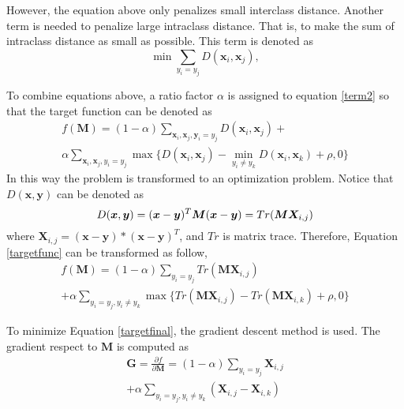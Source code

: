 \documentclass[conference,compsoc]{IEEEtran}
\begin{document}
 However, the equation above only penalizes small interclass distance. Another term is needed to penalize large intraclass distance. That is, to make the sum of intraclass distance as small as possible. This term is denoted as 
 \begin{equation}
 \min \sum_{y_i = y_j} D(\bm{x}_i,\bm{x}_j),
 \end{equation}
 
 To combine equations above, a ratio factor $\alpha$ is assigned to equation \ref{term2} so that the target function can be denoted as 
  \begin{equation}\label{targetfunc}
  \begin{aligned}
 f(\bm{M}) = (1-\alpha)\sum_{\bm{x}_i,\bm{x}_j,\bm{y}_i=y_j} D(\bm{x}_i,\bm{x}_j) + \\ 
 \alpha \sum_{\bm{x}_i,\bm{x}_j,y_i=y_j}\max\{{D(\bm{x}_i,\bm{x}_j)-\min_{y_i\ne y_k}{D(\bm{x}_i,\bm{x}_k)}+\rho,0}\}
 \end{aligned}
 \end{equation}
 In this way the problem is transformed to an optimization problem. Notice that $D(\bm{x},\bm{y})$ can be denoted as 
 \begin{equation}
 D(\bm{x},\bm{y}) = (\bm{x} - \bm{y})^T\bm{M}(\bm{x} - \bm{y})\\ = Tr(\bm{M}\bm{X}_{i,j})
 \end{equation}
 where $\bm{X}_{i,j} = (\bm{x} - \bm{y})*(\bm{x} - \bm{y})^T$, and $Tr$ is matrix trace. Therefore, Equation \ref{targetfunc} can be transformed as follow,
 \begin{equation}\label{targetfinal}
 \begin{aligned}
 f(\bm{M}) = (1-\alpha)\sum_{y_i = y_j}Tr(\bm{M}\bm{X}_{i,j}) \\
  + \alpha \sum_{y_i = y_j,y_i\ne y_k}\max\{Tr(\bm{M}\bm{X}_{i,j}) - Tr(\bm{M}\bm{X}_{i,k} )+ \rho,0\}
 \end{aligned}
 \end{equation}
 
 To minimize Equation \ref{targetfinal}, the gradient descent method is used. The gradient respect to $\bm{M}$ is computed as
 \begin{equation}
 \begin{aligned}
 \bm{G} =\frac{\partial f}{\partial \bm{M}} = (1-\alpha) \sum_{y_i = y_j} \bm{X}_{i,j} \\
 + \alpha \sum_{y_i = y_j, y_i \ne y_k}(\bm{X}_{i,j} - \bm{X}_{i,k})
 \end{aligned}
 \end{equation}
 
\end{document}
